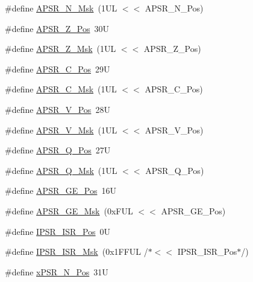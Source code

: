 \begin{DoxyCompactItemize}
\#define \hyperlink{group___c_m_s_i_s___c_o_r_e_gadbc2cf55a026f661b53fadfcf822cef1}{A\+P\+S\+R\+\_\+\+N\+\_\+\+Msk}~(1\+U\+L $<$$<$ A\+P\+S\+R\+\_\+\+N\+\_\+\+Pos)
\item 
\#define \hyperlink{group___c_m_s_i_s___c_o_r_e_ga3661286d108b1aca308d7445685eae3a}{A\+P\+S\+R\+\_\+\+Z\+\_\+\+Pos}~30U
\item 
\#define \hyperlink{group___c_m_s_i_s___c_o_r_e_ga1deb4d1aa72bb83d1f79329406f15711}{A\+P\+S\+R\+\_\+\+Z\+\_\+\+Msk}~(1\+U\+L $<$$<$ A\+P\+S\+R\+\_\+\+Z\+\_\+\+Pos)
\item 
\#define \hyperlink{group___c_m_s_i_s___c_o_r_e_ga6cf72aa6f09a168f9e5beda1a4a887b9}{A\+P\+S\+R\+\_\+\+C\+\_\+\+Pos}~29U
\item 
\#define \hyperlink{group___c_m_s_i_s___c_o_r_e_ga6d47803fbad455bc10bd1ce59f2f335d}{A\+P\+S\+R\+\_\+\+C\+\_\+\+Msk}~(1\+U\+L $<$$<$ A\+P\+S\+R\+\_\+\+C\+\_\+\+Pos)
\item 
\#define \hyperlink{group___c_m_s_i_s___c_o_r_e_gac62830f67679ccd11658c4172c3e6ea7}{A\+P\+S\+R\+\_\+\+V\+\_\+\+Pos}~28U
\item 
\#define \hyperlink{group___c_m_s_i_s___c_o_r_e_ga33305d6701356bff6890b315fe8b5489}{A\+P\+S\+R\+\_\+\+V\+\_\+\+Msk}~(1\+U\+L $<$$<$ A\+P\+S\+R\+\_\+\+V\+\_\+\+Pos)
\item 
\#define \hyperlink{group___c_m_s_i_s___c_o_r_e_ga298749e176f12827328bb7b92a6b2411}{A\+P\+S\+R\+\_\+\+Q\+\_\+\+Pos}~27U
\item 
\#define \hyperlink{group___c_m_s_i_s___c_o_r_e_ga90ffd4ec4149c2f5dd7747c1533fb002}{A\+P\+S\+R\+\_\+\+Q\+\_\+\+Msk}~(1\+U\+L $<$$<$ A\+P\+S\+R\+\_\+\+Q\+\_\+\+Pos)
\item 
\#define \hyperlink{group___c_m_s_i_s___c_o_r_e_ga722cb42b5c75af3e8909fac6fd40dfdc}{A\+P\+S\+R\+\_\+\+G\+E\+\_\+\+Pos}~16U
\item 
\#define \hyperlink{group___c_m_s_i_s___c_o_r_e_ga8a3ecbc0ea2029462b0f4ce50e227db1}{A\+P\+S\+R\+\_\+\+G\+E\+\_\+\+Msk}~(0x\+F\+U\+L $<$$<$ A\+P\+S\+R\+\_\+\+G\+E\+\_\+\+Pos)
\item 
\#define \hyperlink{group___c_m_s_i_s___c_o_r_e_ga0e34027584d02c43811ae908a5ca9adf}{I\+P\+S\+R\+\_\+\+I\+S\+R\+\_\+\+Pos}~0U
\item 
\#define \hyperlink{group___c_m_s_i_s___c_o_r_e_gaf013a4579a64d1f21f56ea9f1b33ab56}{I\+P\+S\+R\+\_\+\+I\+S\+R\+\_\+\+Msk}~(0x1\+F\+F\+U\+L /$\ast$$<$$<$ I\+P\+S\+R\+\_\+\+I\+S\+R\+\_\+\+Pos$\ast$/)
\item 
\#define \hyperlink{group___c_m_s_i_s___c_o_r_e_ga031eb1b8ebcdb3d602d0b9f2ec82a7ae}{x\+P\+S\+R\+\_\+\+N\+\_\+\+Pos}~31U

\end{DoxyCompactItemize}
